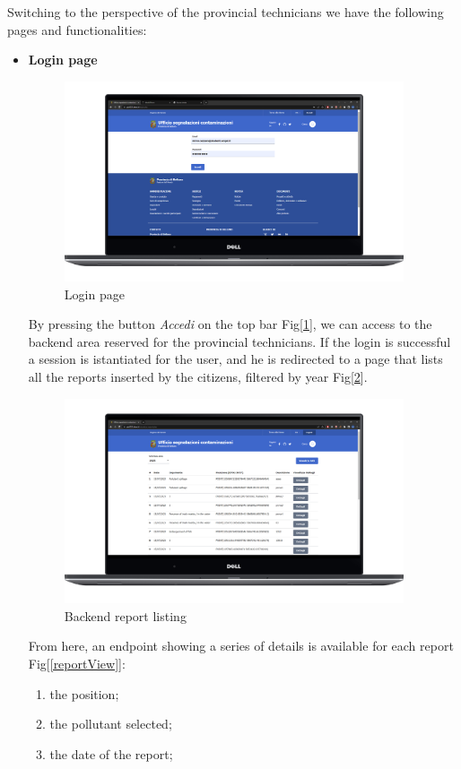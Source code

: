 \pagebreak
Switching to the perspective of the provincial technicians we have the following pages and functionalities:
\begin{itemize}
    \item \textbf{Login page} \\
    \begin{figure}[H]\centering \includegraphics[width=27em]{img/login.png} \caption{Login page} \label{login} \end{figure}
    By pressing the button \textit{Accedi} on the top bar Fig[\ref{login}], we can access to the backend area reserved for the provincial technicians.
    If the login is successful a session is istantiated for the user, and he is redirected to a page that lists all the reports inserted by the citizens, filtered by year Fig[\ref{backendListing}].
    \begin{figure}[H] \centering \includegraphics[width=27em]{img/home_back.png} \caption{Backend report listing} \label{backendListing}\end{figure}
    From here, an endpoint showing a series of details is available for each report Fig[\ref{reportView}]:
    \begin{enumerate}
        \item the position;
        \item the pollutant selected;
        \item the date of the report;

\end{enumerate}
\end{itemize}
